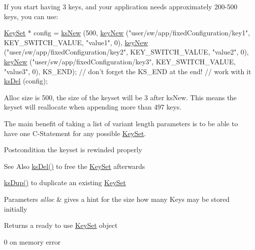 If you start having 3 keys, and your application needs approximately 200-\/500 keys, you can use\-: 
\begin{DoxyCode}
\hyperlink{classkdb_1_1KeySet_a4eac9850fa4f06c07a5306befc3e4377}{KeySet} * config = \hyperlink{group__keyset_ga671e1aaee3ae9dc13b4834a4ddbd2c3c}{ksNew} (500,
        \hyperlink{group__key_gad23c65b44bf48d773759e1f9a4d43b89}{keyNew} (\textcolor{stringliteral}{"user/sw/app/fixedConfiguration/key1"}, KEY\_SWITCH\_VALUE, \textcolor{stringliteral}{
      "value1"}, 0),
        \hyperlink{group__key_gad23c65b44bf48d773759e1f9a4d43b89}{keyNew} (\textcolor{stringliteral}{"user/sw/app/fixedConfiguration/key2"}, KEY\_SWITCH\_VALUE, \textcolor{stringliteral}{
      "value2"}, 0),
        \hyperlink{group__key_gad23c65b44bf48d773759e1f9a4d43b89}{keyNew} (\textcolor{stringliteral}{"user/sw/app/fixedConfiguration/key3"}, KEY\_SWITCH\_VALUE, \textcolor{stringliteral}{
      "value3"}, 0),
        KS\_END); \textcolor{comment}{// don't forget the KS\_END at the end!}
\textcolor{comment}{// work with it}
\hyperlink{group__keyset_ga27e5c16473b02a422238c8d970db7ac8}{ksDel} (config);
\end{DoxyCode}
 Alloc size is 500, the size of the keyset will be 3 after ks\-New. This means the keyset will reallocate when appending more than 497 keys.

The main benefit of taking a list of variant length parameters is to be able to have one C-\/\-Statement for any possible \hyperlink{classkdb_1_1KeySet}{Key\-Set}.

\begin{DoxyPostcond}{Postcondition}
the keyset is rewinded properly
\end{DoxyPostcond}
\begin{DoxySeeAlso}{See Also}
\hyperlink{group__keyset_ga27e5c16473b02a422238c8d970db7ac8}{ks\-Del()} to free the \hyperlink{group__keyset}{Key\-Set} afterwards 

\hyperlink{group__keyset_gac59e4b328245463f1451f68d5106151c}{ks\-Dup()} to duplicate an existing \hyperlink{group__keyset}{Key\-Set} 
\end{DoxySeeAlso}

\begin{DoxyParams}{Parameters}
{\em alloc} & gives a hint for the size how many Keys may be stored initially \\
\hline
\end{DoxyParams}
\begin{DoxyReturn}{Returns}
a ready to use \hyperlink{classkdb_1_1KeySet}{Key\-Set} object 

0 on memory error 
\end{DoxyReturn}



